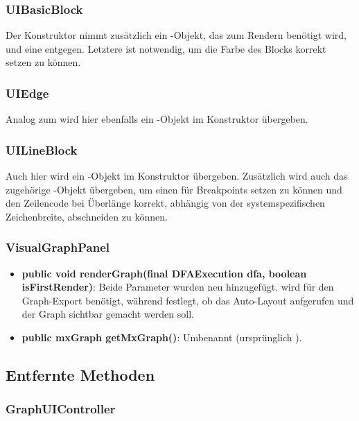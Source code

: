 \subsubsection{UIBasicBlock}

Der Konstruktor nimmt zusätzlich ein -Objekt, das zum Rendern benötigt wird, und eine  entgegen.
Letztere ist notwendig, um die Farbe des Blocks korrekt setzen zu können.

\subsubsection{UIEdge}

Analog zum  wird hier ebenfalls ein -Objekt im Konstruktor übergeben.

\subsubsection{UILineBlock}

Auch hier wird ein -Objekt im Konstruktor übergeben.
Zusätzlich wird auch das zugehörige -Objekt übergeben, um einen  für Breakpoints setzen zu können und den Zeilencode bei Überlänge korrekt, abhängig von der systemspezifischen Zeichenbreite, abschneiden zu können.

\subsubsection{VisualGraphPanel}

\begin{itemize}
  \item \textbf{public void renderGraph(final DFAExecution dfa, boolean isFirstRender)}: Beide Parameter wurden neu hinzugefügt.  wird für den Graph-Export benötigt, während  festlegt, ob das Auto-Layout aufgerufen und der Graph sichtbar gemacht werden soll.
  \item \textbf{public mxGraph getMxGraph()}: Umbenannt (ursprünglich ).
\end{itemize}

\subsection{Entfernte Methoden}

\subsubsection{GraphUIController}

